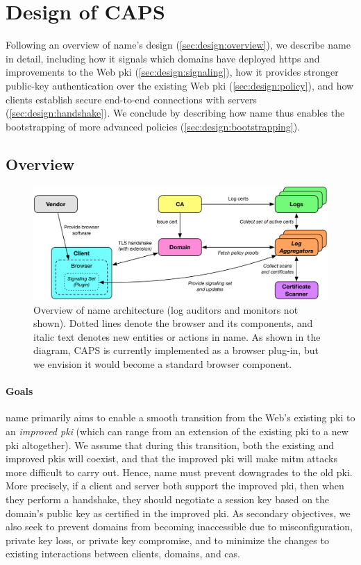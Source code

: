\section{Design of CAPS}
\label{sec:design}

Following an overview of \ac{name}'s design (\autoref{sec:design:overview}), we
describe \ac{name} in detail, including how it signals which domains have
deployed \ac{https} and improvements to the Web \ac{pki}
(\autoref{sec:design:signaling}), how it provides stronger public-key
authentication over the existing Web \ac{pki} (\autoref{sec:design:policy}), and
how clients establish secure end-to-end connections with servers
(\autoref{sec:design:handshake}). We conclude by describing how \ac{name} thus
enables the bootstrapping of more advanced policies
(\autoref{sec:design:bootstrapping}).

\subsection{Overview}
\label{sec:design:overview}

\begin{figure}
  \centering
  \includegraphics[width=0.8\linewidth]{fig/arch}
  \caption{Overview of \ac{name} architecture (log auditors and monitors not
  shown). Dotted lines denote the browser and its components, and italic text
denotes new entities or actions in \ac{name}.  As shown in the diagram,
CAPS is currently implemented as a browser plug-in, but we envision it
would become a standard browser component.
  }
  \label{fig:overview}
\end{figure}

\paragraph{Goals}

\ac{name} primarily aims to enable a smooth transition from the Web's existing
\ac{pki} to an \emph{improved \ac{pki}} (which can range from an extension of
the existing \ac{pki} to a new \ac{pki} altogether). We assume that during this
transition, both the existing and improved \acp{pki} will coexist, and that the
improved \ac{pki} will make \ac{mitm} attacks more difficult to carry out.
Hence, \ac{name} must prevent downgrades to the old \ac{pki}. More precisely, if
a client and server both support the improved \ac{pki}, then when they perform a
handshake, they should negotiate a session key based on the domain's public key
as certified in the improved \ac{pki}. As secondary objectives, we also seek to
prevent domains from becoming inaccessible due to misconfiguration, private key
loss, or private key compromise, and to minimize the changes to existing
interactions between clients, domains, and \acp{ca}.

